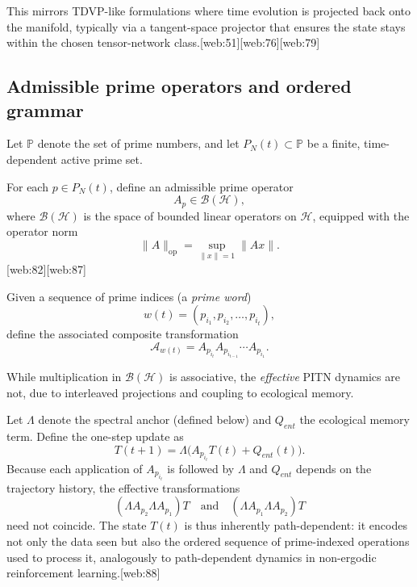 \documentclass[11pt]{article}
\begin{document}
This mirrors TDVP-like formulations where time evolution is projected back onto the manifold, typically via a tangent-space projector that ensures the state stays within the chosen tensor-network class.[web:51][web:76][web:79]

\subsection{Admissible prime operators and ordered grammar}

Let \( \mathbb{P} \) denote the set of prime numbers, and let \( P_N(t) \subset \mathbb{P} \) be a finite, time-dependent active prime set.

\begin{description}[leftmargin=2em]
\item[Definition 1 (Prime operators).]
For each \( p \in P_N(t) \), define an admissible prime operator
\[
A_p \in \mathcal{B}(\mathcal{H}),
\]
where \( \mathcal{B}(\mathcal{H}) \) is the space of bounded linear operators on \( \mathcal{H} \), equipped with the operator norm
\[
\|A\|_{\mathrm{op}} = \sup_{\|x\|=1} \|Ax\|.
\][web:82][web:87]

\item[Prime words and composition.] 
Given a sequence of prime indices (a \emph{prime word})
\[
w(t) = (p_{i_1}, p_{i_2}, \dots, p_{i_t}),
\]
define the associated composite transformation
\[
\mathcal{A}_{w(t)} = A_{p_{i_t}} A_{p_{i_{t-1}}} \cdots A_{p_{i_1}}.
\]

\end{description}

While multiplication in \( \mathcal{B}(\mathcal{H}) \) is associative, the \emph{effective} PITN dynamics are not, due to interleaved projections and coupling to ecological memory.

\begin{description}[leftmargin=2em]
\item[Non-associativity and path dependence.] 
Let \( \Lambda \) denote the spectral anchor (defined below) and \( Q_{ent} \) the ecological memory term. Define the one-step update as
\[
T(t+1) = \Lambda\big(A_{p_{i_t}} T(t) + Q_{ent}(t)\big).
\]
Because each application of \( A_{p_{i_t}} \) is followed by \( \Lambda \) and \( Q_{ent} \) depends on the trajectory history, the effective transformations
\[
(\Lambda A_{p_2} \Lambda A_{p_1})T
\quad\text{and}\quad
(\Lambda A_{p_1} \Lambda A_{p_2})T
\]
need not coincide. The state \( T(t) \) is thus inherently path-dependent: it encodes not only the data seen but also the ordered sequence of prime-indexed operations used to process it, analogously to path-dependent dynamics in non-ergodic reinforcement learning.[web:88]
\end{description}
\end{document}
